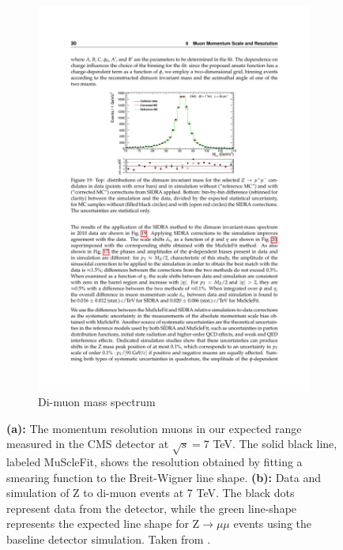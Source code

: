 \begin{figure}[!htb]
\begin{subfigure}[t]{0.48\textwidth}
        \includegraphics[width=\textwidth]{figures/muon_Z_resolution.pdf}
        \caption{Di-muon mass spectrum}
        \label{fig:muon_Z_resolution}
      \end{subfigure}
      \caption[The momentum resolution muons in our expected \pt range measured in the CMS detector at $\sqrt{s} = 7$ TeV, and data and simulation of Z to di-muon events at 7 TeV.]{\textbf{(a):} The momentum resolution muons in our expected \pt range measured in the CMS detector at $\sqrt{s} = 7$ TeV. The solid black line, labeled MuScleFit, shows the resolution obtained by fitting a smearing function\cite[sec. 6.1]{cms_muons} to the Breit-Wigner line shape. \textbf{(b):} Data and simulation of Z to di-muon events at 7 TeV. The black dots represent data from the detector, while the green line-shape represents the expected line shape for Z$\to\mu\mu$ events using the baseline detector simulation. Taken from \cite{cms_muons}.}
    \end{figure}

